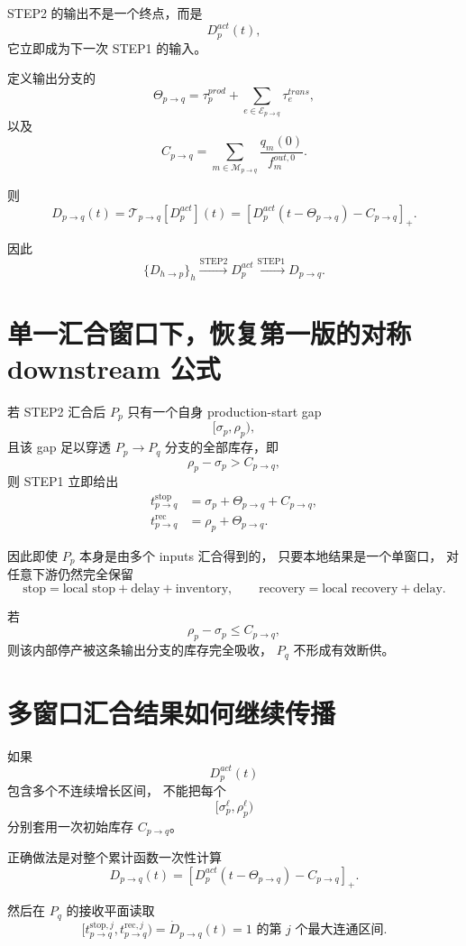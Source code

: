 \documentclass[UTF8,11pt]{ctexart}
\begin{document}
STEP2 的输出不是一个终点，而是
\[
\boxed{
D_p^{act}(t),
}
\]
它立即成为下一次 STEP1 的输入。

定义输出分支的
\[
\Theta_{p\to q}
=
\tau_p^{prod}
+
\sum_{e\in\mathcal E_{p\to q}}
\tau_e^{trans},
\]
以及
\[
C_{p\to q}
=
\sum_{m\in\mathcal M_{p\to q}}
\frac{q_m(0)}{f_m^{out,0}}.
\]

则
\[
\boxed{
D_{p\to q}(t)
=
\mathcal T_{p\to q}[D_p^{act}](t)
=
\left[
D_p^{act}(t-\Theta_{p\to q})
-
C_{p\to q}
\right]_+.
}
\tag{18}
\]

因此
\[
\boxed{
\{D_{h\to p}\}_h
\overset{\mathrm{STEP2}}{\longrightarrow}
D_p^{act}
\overset{\mathrm{STEP1}}{\longrightarrow}
D_{p\to q}.
}
\tag{19}
\]

\section{单一汇合窗口下，恢复第一版的对称 downstream 公式}

若 STEP2 汇合后 \(P_p\) 只有一个自身 production-start gap
\[
[\sigma_p,\rho_p),
\]
且该 gap 足以穿透 \(P_p\to P_q\) 分支的全部库存，即
\[
\rho_p-\sigma_p>C_{p\to q},
\]
则 STEP1 立即给出
\[
\boxed{
\begin{aligned}
t_{p\to q}^{\mathrm{stop}}
&=
\sigma_p
+\Theta_{p\to q}
+C_{p\to q},
\\[1mm]
t_{p\to q}^{\mathrm{rec}}
&=
\rho_p
+\Theta_{p\to q}.
\end{aligned}
}
\tag{20}
\]

因此即使 \(P_p\) 本身是由多个 inputs 汇合得到的，
只要本地结果是一个单窗口，
对任意下游仍然完全保留
\[
\boxed{
\text{stop}=\text{local stop}+\text{delay}+\text{inventory},
\qquad
\text{recovery}=\text{local recovery}+\text{delay}.
}
\tag{21}
\]

若
\[
\rho_p-\sigma_p\le C_{p\to q},
\]
则该内部停产被这条输出分支的库存完全吸收，
\(P_q\) 不形成有效断供。

\section{多窗口汇合结果如何继续传播}

如果
\[
D_p^{act}(t)
\]
包含多个不连续增长区间，
不能把每个
\[
[\sigma_p^\ell,\rho_p^\ell)
\]
分别套用一次初始库存 \(C_{p\to q}\)。

正确做法是对整个累计函数一次性计算
\[
\boxed{
D_{p\to q}(t)
=
[D_p^{act}(t-\Theta_{p\to q})-C_{p\to q}]_+.
}
\tag{22}
\]

然后在 \(P_q\) 的接收平面读取
\[
\boxed{
[t_{p\to q}^{\mathrm{stop},j},
t_{p\to q}^{\mathrm{rec},j})
=
\text{\(\dot D_{p\to q}(t)=1\) 的第 \(j\) 个最大连通区间}.
}
\tag{23}
\]
\end{document}
